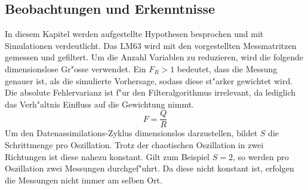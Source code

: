 \begin{refsection}
\section{Beobachtungen und Erkenntnisse}
In diesem Kapitel werden aufgestellte Hypothesen besprochen und mit Simulationen verdeutlicht. Das LM63 wird mit den vorgestellten Messmatritzen gemessen und gefiltert. Um die Anzahl Variablen zu reduzieren, wird die folgende dimensionslose Gr"osse verwendet. Ein $F_{R}>1$ bedeutet, dass die Messung genauer ist, als die simulierte Vorhersage, sodass diese st"arker gewichtet wird. Die absolute Fehlervarianz ist f"ur den Filteralgorithmus irrelevant, da lediglich das Verh"altnis Einfluss auf die Gewichtung nimmt.
\[
F=\frac{Q}{R}
\]
Um den Datenassimilations-Zyklus dimensionslos darzustellen, bildet $S$ die Schrittmenge pro Oszillation. Trotz der chaotischen Oszillation in zwei Richtungen ist diese nahezu konstant. Gilt zum Beispiel $S=2$, so werden pro Oszillation zwei Messungen durchgef"uhrt. Da diese nicht konstant ist, erfolgen die Messungen nicht immer am selben Ort.


\end{refsection}
